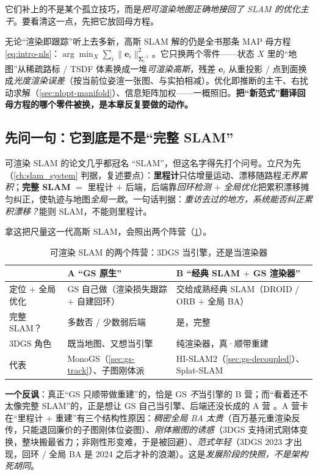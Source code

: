 它们补上的不是某个孤立技巧，而是\emph{把可渲染地图正确地接回了 SLAM 的优化主干}。要看清这一点，先把它放回母方程。

\begin{insight}
无论“渲染即跟踪”听上去多新，高斯 SLAM 解的仍是全书那条 MAP 母方程 \cref{eq:intro-nls}：$\arg\min_{X}\sum_i\lVert\mathbf e_i\rVert^2_{\boldsymbol\Sigma_i^{-1}}$。它只换两个零件——状态 $X$ 里的“地图”从稀疏路标 / TSDF 体素换成一堆\emph{可渲染高斯}，残差 $\mathbf e_i$ 从重投影 / 点到面换成\emph{光度渲染误差}（按当前位姿渲一张图、与实拍相减）。优化即推断的主干、右扰动求解（\cref{sec:nlopt-manifold}）、信息矩阵加权——一概照旧。\textbf{把“新范式”翻译回母方程的哪个零件被换，是本章反复要做的动作。}
\end{insight}

\subsection{先问一句：它到底是不是“完整 SLAM”}

可渲染 SLAM 的论文几乎都冠名 “SLAM”，但这名字得先打个问号。立尺为先（\cref{ch:slam_system} 判据，复述要点）：\textbf{里程计}只估增量运动、漂移随路程\emph{无界累积}；\textbf{完整 SLAM} $=$ 里程计 $+$ 后端，后端靠\emph{回环检测 $+$ 全局优化}把累积漂移摊匀纠正，使轨迹与地图\emph{全局一致}。一句话判据：\emph{重访去过的地方，系统能否纠正累积漂移？}能则 SLAM，不能则里程计。

拿这把尺量这一代高斯 SLAM，会照出两个阵营（\cref{tab:gs-camps}）。

\begin{table}[H]\centering
\caption{可渲染 SLAM 的两个阵营：3DGS 当引擎，还是当渲染器}
\label{tab:gs-camps}
\small
\begin{tabular}{@{}lll@{}}
\toprule
 & \textbf{A “GS 原生”} & \textbf{B “经典 SLAM $+$ GS 渲染器”} \\
\midrule
定位 $+$ 全局优化 & GS 自己做（渲染损失跟踪 $+$ 自建回环）& 交给成熟经典 SLAM（DROID / ORB $+$ 全局 BA）\\
完整 SLAM？ & 多数否 / 少数弱后端 & 是，完整 \\
3DGS 角色 & 既当地图、又想当引擎 & 纯渲染器，真·顺带重建 \\
代表 & MonoGS（\cref{sec:gs-track}）、子图刚体派 & HI-SLAM2（\cref{sec:gs-decoupled}）、Splat-SLAM \\
\bottomrule
\end{tabular}
\end{table}

\textbf{一个反讽}：真正“GS 只顺带做重建”的，恰是 GS \emph{不}当引擎的 B 营；而“看着还不太像完整 SLAM”的，正是想让 GS 自己当引擎、后端还没长成的 A 营 \cite{matsuki2024monogs}。A 营卡在“里程计 $+$ 重建”有三个结构性原因：\emph{稠密全局 BA 太贵}（百万基元重渲染反传，只能退回廉价的子图刚体位姿图）、\emph{刚体搬图的诱惑}（3DGS 支持闭式刚体变换，整块搬最省力；非刚性形变难，于是被回避）、\emph{范式年轻}（3DGS 2023 才出现，回环 / 全局 BA 是 2024 之后才补的浪潮）。这是\emph{发展阶段的快照，不是架构死胡同}。

